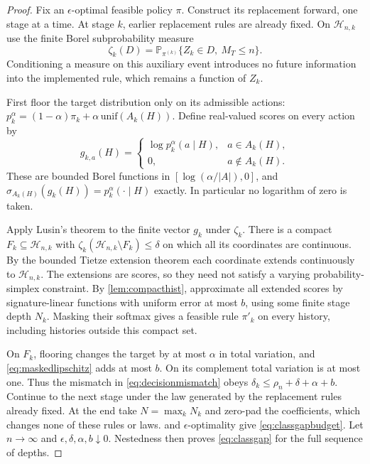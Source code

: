 \documentclass[11pt]{article}
\numberwithin{equation}{section}
\theoremstyle{definition}
\theoremstyle{remark}
\theoremstyle{definition}
\newcommand{\Pp}{\mathbb P}
\begin{document}
\begin{proof}
Fix an $\epsilon$-optimal feasible policy $\pi$. Construct its replacement
forward, one stage at a time. At stage $k$, earlier replacement rules are
already fixed. On $\mathcal H_{n,k}$ use the finite Borel subprobability
measure
\[
 \zeta_k(D)=\Pp_{\pi^{(k)}}\{Z_k\in D,\ M_T\le n\}.
\]
Conditioning a measure on this auxiliary event introduces no future
information into the implemented rule, which remains a function of $Z_k$.

First floor the target distribution only on its admissible actions:
$p_k^\alpha=(1-\alpha)\pi_k+
\alpha\,\mathrm{unif}(A_k(H))$. Define real-valued scores on every action by
\[
 g_{k,a}(H)=
 \begin{cases}
  \log p_k^\alpha(a\mid H),&a\in A_k(H),\\
  0,&a\notin A_k(H).
 \end{cases}
\]
These are bounded Borel functions in $[\log(\alpha/|A|),0]$, and
$\sigma_{A_k(H)}(g_k(H))=p_k^\alpha(\cdot\mid H)$ exactly.
In particular no logarithm of zero is taken.

Apply Lusin's theorem to the finite vector $g_k$ under $\zeta_k$. There
is a compact $F_k\subseteq\mathcal H_{n,k}$ with
$\zeta_k(\mathcal H_{n,k}\setminus F_k)\le\delta$ on which all its
coordinates are continuous. By the bounded Tietze extension theorem each
coordinate extends continuously to $\mathcal H_{n,k}$. The extensions are
scores, so they need not satisfy a varying probability-simplex constraint.
By \cref{lem:compacthist}, approximate all extended scores by
signature-linear functions with uniform error at most $b$, using some
finite stage depth $N_k$. Masking their softmax gives a feasible rule
$\pi'_k$ on every history, including histories outside this compact set.

On $F_k$, flooring changes the target by at most $\alpha$ in total
variation, and \eqref{eq:maskedlipschitz} adds at most $b$. On its complement
total variation is at most one. Thus the mismatch in
\eqref{eq:decisionmismatch} obeys
$\delta_k\le\rho_n+\delta+\alpha+b$. Continue to the next stage under
the law generated by the replacement rules already fixed. At the end take
$N=\max_k N_k$ and zero-pad the coefficients, which changes none of these
rules or laws.  and $\epsilon$-optimality give
\eqref{eq:classgapbudget}. Let $n\to\infty$ and
$\epsilon,\delta,\alpha,b\downarrow0$. Nestedness then proves
\eqref{eq:classgap} for the full sequence of depths.
\end{proof}
\end{document}
